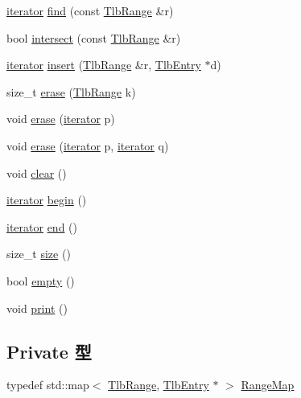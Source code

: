 \begin{DoxyCompactItemize}
\item 
\hyperlink{classSparcISA_1_1TlbMap_ae61c5513b9ac04615ba7927f47c3ec69}{iterator} \hyperlink{classSparcISA_1_1TlbMap_ad25b6004936857e5ce25afbe6b9485ec}{find} (const \hyperlink{structSparcISA_1_1TlbRange}{TlbRange} \&r)
\item 
bool \hyperlink{classSparcISA_1_1TlbMap_a61c6ed5976ad034997bfe6e12975e1d6}{intersect} (const \hyperlink{structSparcISA_1_1TlbRange}{TlbRange} \&r)
\item 
\hyperlink{classSparcISA_1_1TlbMap_ae61c5513b9ac04615ba7927f47c3ec69}{iterator} \hyperlink{classSparcISA_1_1TlbMap_a66f7339d1c0cbb7021619a0011102afc}{insert} (\hyperlink{structSparcISA_1_1TlbRange}{TlbRange} \&r, \hyperlink{structSparcISA_1_1TlbEntry}{TlbEntry} $\ast$d)
\item 
size\_\-t \hyperlink{classSparcISA_1_1TlbMap_ab71c9199b5e117ec8171d532e4482d6c}{erase} (\hyperlink{structSparcISA_1_1TlbRange}{TlbRange} k)
\item 
void \hyperlink{classSparcISA_1_1TlbMap_a1e39aaf15fad060923b688d4a936624b}{erase} (\hyperlink{classSparcISA_1_1TlbMap_ae61c5513b9ac04615ba7927f47c3ec69}{iterator} p)
\item 
void \hyperlink{classSparcISA_1_1TlbMap_a8645d9bde1addc5c75d4076d0f016a98}{erase} (\hyperlink{classSparcISA_1_1TlbMap_ae61c5513b9ac04615ba7927f47c3ec69}{iterator} p, \hyperlink{classSparcISA_1_1TlbMap_ae61c5513b9ac04615ba7927f47c3ec69}{iterator} q)
\item 
void \hyperlink{classSparcISA_1_1TlbMap_ac8bb3912a3ce86b15842e79d0b421204}{clear} ()
\item 
\hyperlink{classSparcISA_1_1TlbMap_ae61c5513b9ac04615ba7927f47c3ec69}{iterator} \hyperlink{classSparcISA_1_1TlbMap_ad69bd11391be1a1dba5c8202259664f8}{begin} ()
\item 
\hyperlink{classSparcISA_1_1TlbMap_ae61c5513b9ac04615ba7927f47c3ec69}{iterator} \hyperlink{classSparcISA_1_1TlbMap_acad38d52497a975bfb6f2f6acd76631f}{end} ()
\item 
size\_\-t \hyperlink{classSparcISA_1_1TlbMap_a0b6b70701c46e22849f0f363861351cd}{size} ()
\item 
bool \hyperlink{classSparcISA_1_1TlbMap_a3f37b042a1e7cd4bd38fc564de81f0da}{empty} ()
\item 
void \hyperlink{classSparcISA_1_1TlbMap_a388f572c62279f839ee138a9afbdeeb5}{print} ()
\end{DoxyCompactItemize}
\subsection*{Private 型}
\begin{DoxyCompactItemize}
\item 
typedef std::map$<$ \hyperlink{structSparcISA_1_1TlbRange}{TlbRange}, \hyperlink{structSparcISA_1_1TlbEntry}{TlbEntry} $\ast$ $>$ \hyperlink{classSparcISA_1_1TlbMap_a650c099a836955a5aafd619e38c1f69d}{RangeMap}
\end{DoxyCompactItemize}
